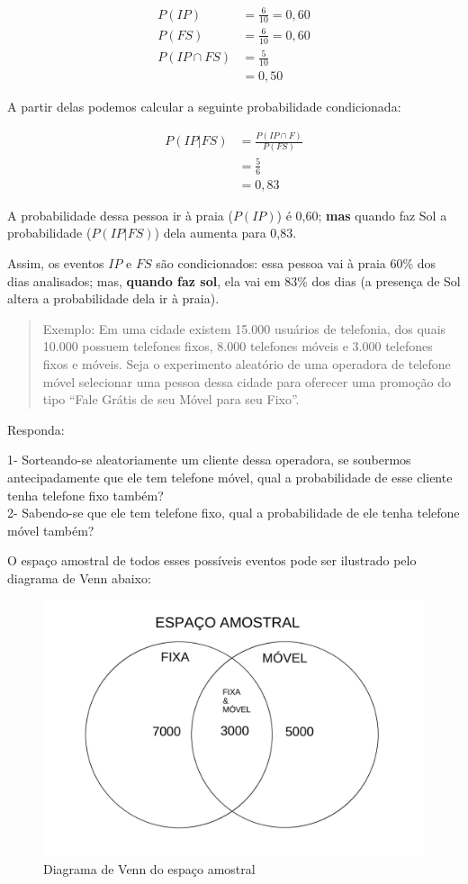 \documentclass[
]{book}
\begin{document}
\begin{align*}
P(IP) & = \frac{6}{10}= 0,60 \\
P(FS) & = \frac{6}{10}= 0,60 \\
P(IP \cap FS) & = \frac{5}{10} \\
    & = 0,50 
\end{align*}

A partir delas podemos calcular a seguinte probabilidade condicionada:

\begin{align*}
P(IP|FS) & = \frac{ P(IP \cap F)}{ P(FS)} \\
       & = \frac{5}{6} \\
       & = 0,83     
\end{align*}

A probabilidade dessa pessoa ir à praia (\(P(IP)\)) é 0,60; \textbf{mas} quando faz Sol a probabilidade (\(P(IP|FS)\)) dela aumenta para 0,83.

Assim, os eventos \(IP\) e \(FS\) são condicionados: essa pessoa vai à praia 60\% dos dias analisados; mas, \textbf{quando faz sol}, ela vai em 83\% dos dias (a presença de Sol altera a probabilidade dela ir à praia).

\begin{quote}
Exemplo: Em uma cidade existem 15.000 usuários de telefonia, dos quais 10.000 possuem telefones fixos, 8.000 telefones móveis e 3.000 telefones fixos e móveis. Seja o experimento aleatório de uma operadora de telefone móvel selecionar uma pessoa dessa cidade para oferecer uma promoção do tipo ``Fale Grátis de seu Móvel para seu Fixo''.
\end{quote}

Responda:

1- Sorteando-se aleatoriamente um cliente dessa operadora, se soubermos antecipadamente que ele tem telefone móvel, qual a probabilidade de esse cliente tenha telefone fixo também?\\
2- Sabendo-se que ele tem telefone fixo, qual a probabilidade de ele tenha telefone móvel também?

O espaço amostral de todos esses possíveis eventos pode ser ilustrado pelo diagrama de Venn abaixo:

\hfill\break

\begin{figure}

{\centering \includegraphics[width=0.5\linewidth]{images4/exercicio} 

}

\caption{Diagrama de Venn do espaço amostral}\label{fig:unnamed-chunk-70}
\end{figure}
\end{document}
